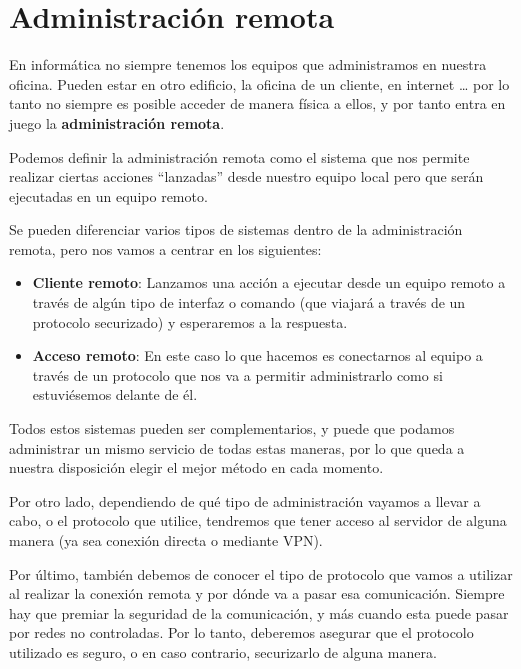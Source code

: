 \chapter{Administración remota}

En informática no siempre tenemos los equipos que administramos en nuestra oficina. Pueden estar en otro edificio, la oficina de un cliente, en internet … por lo tanto no siempre es posible acceder de manera física a ellos, y por tanto entra en juego la \textbf{administración remota}.

Podemos definir la administración remota como el sistema que nos permite realizar ciertas acciones “lanzadas” desde nuestro equipo local pero que serán ejecutadas en un equipo remoto.

Se pueden diferenciar varios tipos de sistemas dentro de la administración remota, pero nos vamos a centrar en los siguientes:

\begin{itemize}
    \item \textbf{Cliente remoto}: Lanzamos una acción a ejecutar desde un equipo remoto a través de algún tipo de interfaz o comando (que viajará a través de un protocolo securizado) y esperaremos a la respuesta.

    \item \textbf{Acceso remoto}: En este caso lo que hacemos es conectarnos al equipo a través de un protocolo que nos va a permitir administrarlo como si estuviésemos delante de él.
\end{itemize}

Todos estos sistemas pueden ser complementarios, y puede que podamos administrar un mismo servicio de todas estas maneras, por lo que queda a nuestra disposición elegir el mejor método en cada momento.

Por otro lado, dependiendo de qué tipo de administración vayamos a llevar a cabo, o el protocolo que utilice, tendremos que tener acceso al servidor de alguna manera (ya sea conexión directa o mediante VPN).


Por último, también debemos de conocer el tipo de protocolo que vamos a utilizar al realizar la conexión remota y por dónde va a pasar esa comunicación. Siempre hay que premiar la seguridad de la comunicación, y más cuando esta puede pasar por redes no controladas. Por lo tanto, deberemos asegurar que el protocolo utilizado es seguro, o en caso contrario, securizarlo de alguna manera.

